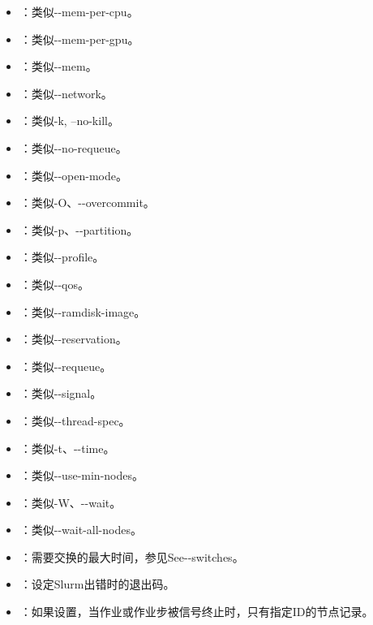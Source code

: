 \begin{itemize}
	\item {}：类似-{}-mem-per-cpu。
	\item {}：类似-{}-mem-per-gpu。
	\item {}：类似-{}-mem。
	\item {}：类似-{}-network。
	\item {}：类似-k, --no-kill。
	\item {}：类似-{}-no-requeue。
	\item {}：类似-{}-open-mode。
	\item {}：类似-O、-{}-overcommit。
	\item {}：类似-p、-{}-partition。
	\item {}：类似-{}-profile。
	\item {}：类似-{}-qos。
	\item {}：类似-{}-ramdisk-image。
	\item {}：类似-{}-reservation。
	\item {}：类似-{}-requeue。
	\item {}：类似-{}-signal。
	\item {}：类似-{}-thread-spec。
	\item {}：类似-t、-{}-time。
	\item {}：类似-{}-use-min-nodes。
	\item {}：类似-W、-{}-wait。
	\item {}：类似-{}-wait-all-nodes。
	\item {}：需要交换的最大时间，参见See-{}-switches。
	\item {}：设定Slurm出错时的退出码。
	\item {}：如果设置，当作业或作业步被信号终止时，只有指定ID的节点记录。
\end{itemize}

